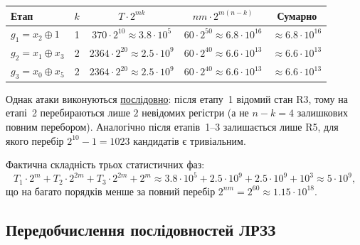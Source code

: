 \begin{center}
    \begin{tabular}{|l|c|c|c|c|}
        \hline
        \textbf{Етап}          & $k$                                         & $T \cdot 2^{mk}$                           & $nm \cdot 2^{m(n-k)}$ & \textbf{Сумарно} \\
        \hline
        $g_1 = x_2 \oplus 1$   & 1                                           & $370 \cdot 2^{10} \approx 3.8 \cdot 10^5$
                               & $60 \cdot 2^{50} \approx 6.8 \cdot 10^{16}$
                               & $\approx 6.8 \cdot 10^{16}$                                                                                                         \\
        $g_2 = x_1 \oplus x_3$ & 2                                           & $2364 \cdot 2^{20} \approx 2.5 \cdot 10^9$
                               & $60 \cdot 2^{40} \approx 6.6 \cdot 10^{13}$
                               & $\approx 6.6 \cdot 10^{13}$                                                                                                         \\
        $g_3 = x_0 \oplus x_5$ & 2                                           & $2364 \cdot 2^{20} \approx 2.5 \cdot 10^9$
                               & $60 \cdot 2^{40} \approx 6.6 \cdot 10^{13}$
                               & $\approx 6.6 \cdot 10^{13}$                                                                                                         \\
        \hline
    \end{tabular}
\end{center}

Однак атаки виконуються \underline{послідовно}: після етапу~1 відомий стан R3, тому на етапі~2 перебираються лише 
$2$ невідомих регістри (а не $n - k = 4$ залишкових повним перебором). Аналогічно після етапів~1--3 залишається 
лише R5, для якого перебір $2^{10} - 1 = 1023$ кандидатів є тривіальним.

\noindent Фактична складність трьох статистичних фаз:
\begin{equation}
    \label{eq:summary_complexity}
    T_1 \cdot 2^{m} + T_2 \cdot 2^{2m} + T_3 \cdot 2^{2m} + 2^{m}
    \approx 3.8 \cdot 10^5 + 2.5 \cdot 10^9 + 2.5 \cdot 10^9 + 10^3 
    \approx 5 \cdot 10^9,
\end{equation}
що на багато порядків менше за повний перебір $2^{nm} = 2^{60} \approx 1.15 \cdot 10^{18}$.

\subsection{Передобчислення послідовностей ЛРЗЗ}

